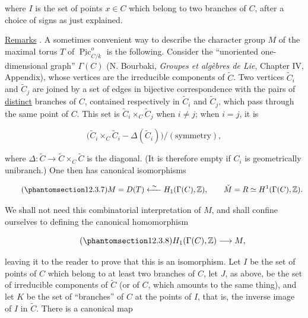 \noindent
where $I$ is the set of points $x\in C$ which belong to two branches of
$C$, after a choice of signs as just explained.

\medskip
\noindent
\underline{Remarks} . A sometimes convenient way to describe the
character group $M$ of the maximal torus $T$ of
$\underline{\operatorname{Pic}}^o_{C/k}$ is the following. Consider the
``unoriented one-dimensional graph'' $\Gamma(C)$ (N. Bourbaki,
\emph{Groupes et alg\`ebres de Lie}, Chapter IV, Appendix), whose vertices
are the irreducible components of $\widetilde C$. Two vertices
$\widetilde C_i$ and $\widetilde C_j$ are joined by a set of edges in
bijective correspondence with the pairs of \underline{distinct} branches
of $C$, contained respectively in $\widetilde C_i$ and
$\widetilde C_j$, which pass through the same point of $C$. This set is
$\widetilde C_i\times_C\widetilde C_j$ when $i\neq j$; when $i=j$, it is

\begin{equation*}
 \bigl(\widetilde C_i\times_C\widetilde C_i-
       \Delta(\widetilde C_i)\bigr)/(\text{symmetry}),
\end{equation*}

\noindent
where $\Delta:\widetilde C\to\widetilde C\times_C\widetilde C$ is the
diagonal. (It is therefore empty if $C_i$ is geometrically unibranch.) One
then has canonical isomorphisms

\begin{equation}\tag{\SGARefTarget{sga7.sga7i.eix.n12-3-7.occ-2}{12.3.7}}
 M=D(T)\xleftarrow{\ \sim\ }H_1(\Gamma(C),\mathbb Z),
 \qquad
 \check M=R\simeq H^1(\Gamma(C),\mathbb Z).
\end{equation}

We shall not need this combinatorial interpretation of $M$, and shall
confine ourselves to defining the canonical homomorphism

\begin{equation}\tag{\SGARefTarget{sga7.sga7i.eix.n12-3-8}{12.3.8}}
 H_1(\Gamma(C),\mathbb Z)\longrightarrow M,
\end{equation}

\noindent
leaving it to the reader to prove that this is an isomorphism. Let $I$ be
the set of points of $C$ which belong to at least two branches of $C$,
let $J$, as above, be the set of irreducible components of $\widetilde C$
(or of $C$, which amounts to the same thing), and let $K$ be the set of
``branches'' of $C$ at the points of $I$, that is, the inverse image of
$I$ in $\widetilde C$. There is a canonical map

